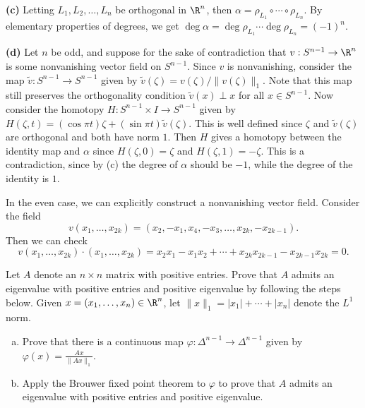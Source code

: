 \documentclass[11pt,letterpaper]{article}
\begin{document}
\begin{solution}
    \textbf{(c)} Letting $L_1,L_2, \ldots, L_n$ be orthogonal in $\R^n$, then $\alpha = \rho_{L_1}\circ \cdots\circ \rho_{L_n}$. By elementary properties of degrees, we get $\deg \alpha = \deg \rho_{L_1} \cdots \deg \rho_{L_n} = (-1)^n$.

    \textbf{(d)} Let $n$ be odd, and suppose for the sake of contradiction that $v : S^{n-1} \to \R^n$ is some nonvanishing vector field on $S^{n-1}$. Since $v$ is nonvanishing, consider the map $\widetilde{v} : S^{n-1} \to S^{n-1}$ given by $\widetilde{v}(\zeta) = v(\zeta) /\|v(\zeta)\|_1$. Note that this map still preserves the orthogonality condition $\widetilde{v}(x)\perp x$ for all $x\in S^{n-1}$. Now consider the homotopy $H : S^{n-1}\times I \to S^{n-1}$ given by $H(\zeta, t) = (\cos \pi t) \zeta + (\sin\pi t)\widetilde{v}(\zeta)$. This is well defined since $\zeta$ and $\widetilde{v}(\zeta)$ are orthogonal and both have norm $1$. Then $H$ gives a homotopy between the identity map and $\alpha$ since $H(\zeta,0)=\zeta$ and $H(\zeta,1)=-\zeta$. This is a contradiction, since by (c) the degree of $\alpha$ should be $-1$, while the degree of the identity is $1$.

    In the even case, we can explicitly construct a nonvanishing vector field. Consider the field
    \[
        v(x_1,\ldots,x_{2k}) = (x_2, -x_1, x_4, -x_3, \ldots, x_{2k}, -x_{2k-1})
    .\] 
    Then we can check
    \[
        v(x_1,\ldots,x_{2k})\cdot (x_1,\ldots,x_{2k}) = x_2x_1 - x_1x_2+\cdots+x_{2k}x_{2k-1} - x_{2k-1}x_{2k}=0
    .\] 
\end{solution}

\begin{problem}
    Let $A$ denote an $n\times n$ matrix with positive entries. Prove that $A$ admits an eigenvalue with positive entries and positive eigenvalue by following the steps below. Given $x = (x_1,\ldots,x_n)\in \R^n$, let $\|x\|_1 = |x_1|+\cdots+|x_n|$ denote the $L^1$ norm.
    \begin{enumerate}[(a)]
        \item Prove that there is a continuous map $\varphi : \Delta^{n-1} \to \Delta^{n-1}$ given by $\varphi(x)=\frac{Ax}{\|Ax\|_1}$.
        \item Apply the Brouwer fixed point theorem to $\varphi$ to prove that $A$ admits an eigenvalue with positive entries and positive eigenvalue.  
    \end{enumerate}         
\end{problem}
\end{document}
